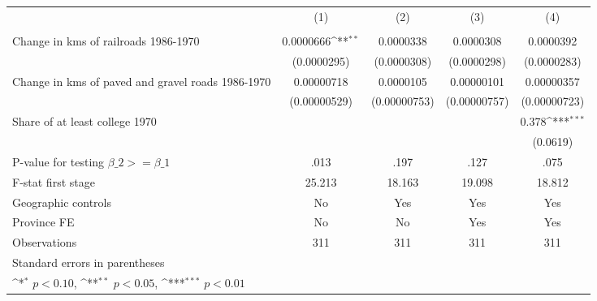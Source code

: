 {
\def\sym#1{\ifmmode^{#1}\else\(^{#1}\)\fi}
\begin{tabular}{l*{4}{c}}
\hline\hline
                &\multicolumn{1}{c}{(1)}&\multicolumn{1}{c}{(2)}&\multicolumn{1}{c}{(3)}&\multicolumn{1}{c}{(4)}\\
                &\multicolumn{1}{c}{}&\multicolumn{1}{c}{}&\multicolumn{1}{c}{}&\multicolumn{1}{c}{}\\
\hline
Change in kms of railroads 1986-1970&0.0000666\sym{**} &0.0000338         &0.0000308         &0.0000392         \\
                &(0.0000295)         &(0.0000308)         &(0.0000298)         &(0.0000283)         \\
[1em]
Change in kms of paved and gravel roads 1986-1970&0.00000718         &0.0000105         &0.00000101         &0.00000357         \\
                &(0.00000529)         &(0.00000753)         &(0.00000757)         &(0.00000723)         \\
[1em]
Share of at least college 1970&                  &                  &                  &    0.378\sym{***}\\
                &                  &                  &                  & (0.0619)         \\
\hline
P-value for testing $\beta\_{2} >= \beta\_{1}$&     .013         &     .197         &     .127         &     .075         \\
F-stat first stage&   25.213         &   18.163         &   19.098         &   18.812         \\
Geographic controls&       No         &      Yes         &      Yes         &      Yes         \\
Province FE     &       No         &       No         &      Yes         &      Yes         \\
Observations    &      311         &      311         &      311         &      311         \\
\hline\hline
\multicolumn{5}{l}{\footnotesize Standard errors in parentheses}\\
\multicolumn{5}{l}{\footnotesize \sym{*} \(p<0.10\), \sym{**} \(p<0.05\), \sym{***} \(p<0.01\)}\\
\end{tabular}
}
